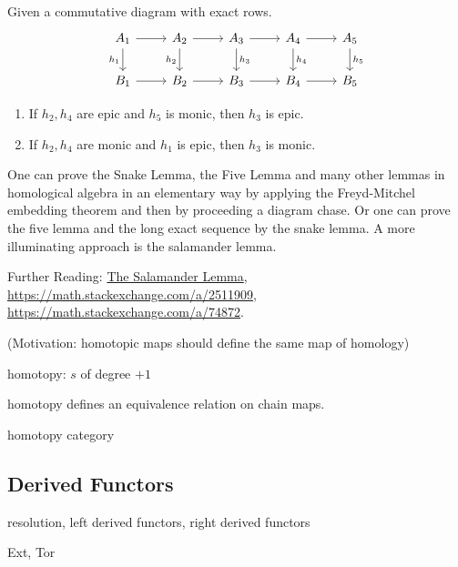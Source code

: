 \begin{lemma}
  Given a commutative diagram with exact rows.
  \begin{equation*}
    \begin{tikzcd}
      A_1 & A_2 & A_3 & A_4 & A_5\\
      B_1 & B_2 & B_3 & B_4 & B_5
      \arrow[from=1-1,]{1-2}[]{}
      \arrow[from=1-2,]{1-3}[]{}
      \arrow[from=1-3,]{1-4}[]{}
      \arrow[from=1-4,]{1-5}[]{}
      \arrow[from=2-1,]{2-2}[]{}
      \arrow[from=2-2,]{2-3}[]{}
      \arrow[from=2-3,]{2-4}[]{}
      \arrow[from=2-4,]{2-5}[]{}
      \arrow[from=1-1,]{2-1}[swap]{h_1}
      \arrow[from=1-2,]{2-2}[swap]{h_2}
      \arrow[from=1-3,]{2-3}[]{h_3}
      \arrow[from=1-4,]{2-4}[]{h_4}
      \arrow[from=1-5,]{2-5}[]{h_5}
    \end{tikzcd}
  \end{equation*}
  \begin{enumerate}
    \item If $h_2, h_4$ are epic and $h_5$ is monic, then $h_3$ is epic.
    \item If $h_2, h_4$ are monic and $h_1$ is epic, then $h_3$ is monic.
  \end{enumerate}
\end{lemma}

One can prove the Snake Lemma, the Five Lemma and many other lemmas in homological algebra in an elementary way by applying the Freyd-Mitchel embedding theorem and then by proceeding a diagram chase. Or one can prove the five lemma and the long exact sequence by the snake lemma. A more illuminating approach is the salamander lemma.

Further Reading: \href{https://ncatlab.org/nlab/show/salamander+lemma}{The Salamander Lemma}, \url{https://math.stackexchange.com/a/2511909}, \url{https://math.stackexchange.com/a/74872}.

(Motivation: homotopic maps should define the same map of homology)

homotopy: $s$ of degree $+1$

homotopy defines an equivalence relation on chain maps.

homotopy category

\subsection{Derived Functors}

resolution, left derived functors, right derived functors

Ext, Tor
